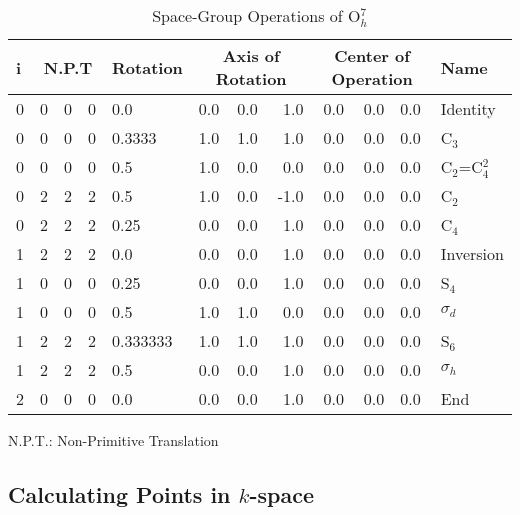 \begin{table}
\caption{\label{sgo}
 Space-Group Operations of O$_h^7$}
\begin{center}
\begin{tabular}{lllllllrrrll}\\ \hline
i& \multicolumn{3}{c}{N.P.T}  & Rotation & \multicolumn{3}{c}{Axis of Rotation} &
 \multicolumn{3}{c}{Center of Operation}& Name\\ \hline
0& 0& 0& 0& 0.0     &  0.0&0.0 &1.0 &  0.0& 0.0& 0.0 &  Identity  \\
0& 0& 0& 0& 0.3333  &  1.0&1.0 &1.0 &  0.0& 0.0& 0.0 &  C$_3$  \\
0& 0& 0& 0& 0.5     &  1.0&0.0 &0.0 &  0.0& 0.0& 0.0 &  C$_2$=C$_4^2$  \\
0& 2& 2& 2& 0.5     &  1.0&0.0 &-1.0 & 0.0& 0.0& 0.0 &  C$_2$  \\
0& 2& 2& 2& 0.25    &  0.0&0.0 &1.0 &  0.0& 0.0& 0.0 &  C$_4$  \\
1& 2& 2& 2& 0.0     &  0.0&0.0 &1.0 &  0.0& 0.0& 0.0 &  Inversion  \\
1& 0& 0& 0& 0.25    &  0.0&0.0 &1.0 &  0.0& 0.0& 0.0 &  S$_4$  \\
1& 0& 0& 0& 0.5     &  1.0&1.0 &0.0 &  0.0& 0.0& 0.0 &  $\sigma_d$  \\
1& 2& 2& 2& 0.333333&  1.0&1.0 &1.0 &  0.0& 0.0& 0.0 &  S$_6$  \\
1& 2& 2& 2& 0.5     &  0.0&0.0 &1.0 &  0.0& 0.0& 0.0 &  $\sigma_h$  \\
2& 0& 0& 0& 0.0     &  0.0&0.0 &1.0 &  0.0& 0.0& 0.0 &  End  \\ \hline
\end{tabular}

N.P.T.: Non-Primitive Translation \end{center}
\end{table}

\subsection{Calculating Points in $k$-space}

